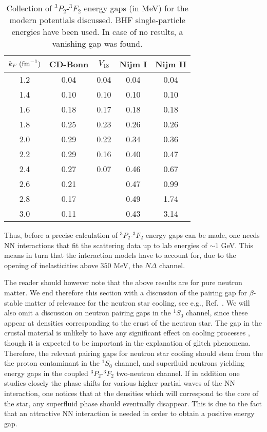 \documentclass{ws-p9-75x6-50}
\begin{document}
\begin{table}[hbtp]
\begin{center}
\caption{Collection of $^3P_2$-$^3F_2$ energy gaps (in MeV) for the 
modern potentials discussed.  
BHF single-particle energies have been used. In case of no results,
a vanishing gap was found.}
\begin{tabular}{ccccc}\hline 
\multicolumn{1}{c}{$k_F\;({\rm fm}^{-1})$}& 
\multicolumn{1}{c}{CD-Bonn}&\multicolumn{1}{c}{$V_{18}$}&
\multicolumn{1}{c}{Nijm I}&\multicolumn{1}{c}{Nijm II} \\ \hline  
     1.2  & 0.04 & 0.04 & 0.04  & 0.04  \\
     1.4  & 0.10 & 0.10 & 0.10  & 0.10  \\
     1.6  & 0.18 & 0.17 & 0.18  & 0.18  \\
     1.8  & 0.25 & 0.23 & 0.26  & 0.26  \\
     2.0  & 0.29 & 0.22 & 0.34  & 0.36  \\
     2.2  & 0.29 & 0.16 & 0.40  & 0.47  \\
     2.4  & 0.27 & 0.07 & 0.46  & 0.67  \\
     2.6  & 0.21 &      & 0.47  & 0.99  \\
     2.8  & 0.17 &      & 0.49  & 1.74  \\
     3.0  & 0.11 &      & 0.43  & 3.14  \\ \hline
\end{tabular}
\label{tab:pgaps}
\end{center}
\end{table} 
Thus, before a precise calculation of $^3P_2$-$^3F_2$ energy gaps
can be made, one needs NN interactions that fit the scattering
data up to lab energies of $\sim 1$ GeV. This means 
in turn that the interaction models have to 
account for, due to the opening
of inelasticities above $350$ MeV, the
$N\Delta$ channel.


The reader should however note that the above results are
for pure neutron matter. We end therefore this section
with a discussion of the pairing gap for $\beta$-stable
matter of relevance for the neutron star cooling, see e.g.,
Ref.\ \cite{report}.
We will also omit a discussion on neutron pairing gaps in the
$^1S_0$ channel, since these appear at densities corresponding 
to the crust of the neutron star. The gap in the crustal material 
is unlikely
to have any significant effect on cooling processes \cite{pr95}, 
though
it is expected to be important in the explanation 
of glitch phenomena.
Therefore, the relevant pairing gaps for neutron star cooling
should stem from the 
the proton contaminant 
in the $^1S_0$ channel, and superfluid neutrons yielding energy gaps 
in the coupled $^3P_2$-$^3F_2$ two-neutron channel. 
If in addition one studies closely the phase shifts for
various higher partial waves of the NN interaction, one notices
that at the densities which will correspond to the  
core of the star, any superfluid 
phase should eventually disappear. This is due to the fact that
an attractive NN interaction is needed in order to
obtain a positive energy gap.
\end{document}
